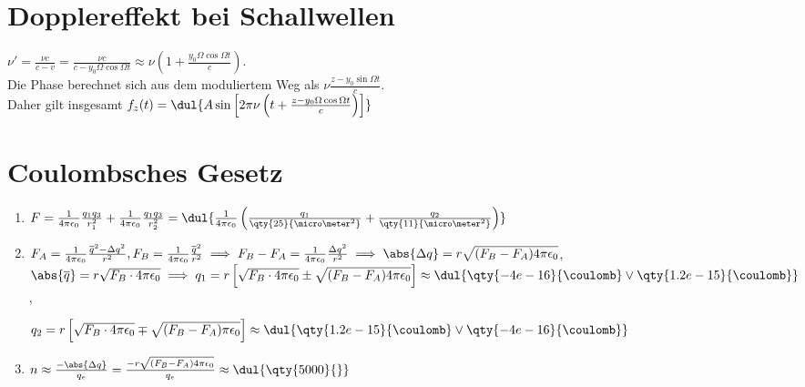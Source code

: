 \documentclass{article}
\begin{document}

\section{Dopplereffekt bei Schallwellen}
$\nu' = \frac{\nu c}{c - v} = \frac{\nu c }{c - y_0 \Omega \cos \Omega t} 
\approx \nu \left(1 + \frac{y_0 \Omega \cos \Omega t}{c}\right)$. \\
Die Phase berechnet sich aus dem moduliertem Weg als $\nu \frac{z - y_0 \sin \Omega t}{c}$. \\
Daher gilt insgesamt $f_z(t) = \dul{A \sin \left[2 \pi \nu \left(t + \frac{z - y_0 \Omega \cos \Omega t}{c}\right)\right]}$

\section{Coulombsches Gesetz}
\begin{enumerate}[label=\alph*)]
    \item $F = \frac{1}{4 \pi \epsilon_0} \frac{q_1 q_3}{r_1^2} + \frac{1}{4 \pi \epsilon_0} \frac{q_1 q_3}{r_2^2}
    = \dul{\frac{1}{4 \pi \epsilon_0} \left(\frac{q_1}{\qty{25}{\micro \meter^2}} + \frac{q_2}{\qty{11}{\micro \meter^2}}\right)}$

    \item $F_A = \frac{1}{4 \pi \epsilon_0} \frac{\overline{q}^2 - \Delta q^2}{r^2}, 
    F_B = \frac{1}{4 \pi \epsilon_0} \frac{\overline{q}^2}{r^2} 
    \implies F_B - F_A = \frac{1}{4 \pi \epsilon_0} \frac{\Delta q^2}{r^2}
    \implies \abs{\Delta q} = r \sqrt{(F_B - F_A) 4 \pi \epsilon_0}$, \\
    $\abs{\overline{q}} = r \sqrt{F_B \cdot 4 \pi \epsilon_0}
    \implies q_1 = r \left[\sqrt{F_B \cdot 4 \pi \epsilon_0} \pm \sqrt{(F_B - F_A) 4\pi \epsilon_0}\right]
    \approx \dul{\qty{-4e-16}{\coulomb} \vee \qty{1.2e-15}{\coulomb}}$, 

    $q_2 = r \left[\sqrt{F_B \cdot 4 \pi \epsilon_0} \mp \sqrt{(F_B - F_A) \pi \epsilon_0} \right]
    \approx \dul{\qty{1.2e-15}{\coulomb} \vee \qty{-4e-16}{\coulomb}}$


    \item $n \approx \frac{-\abs{\Delta q}}{q_e} = \frac{-r \sqrt{(F_B - F_A) 4 \pi \epsilon_0}}{q_e}
    \approx \dul{\qty{5000}{}}$
\end{enumerate}
\end{document}
